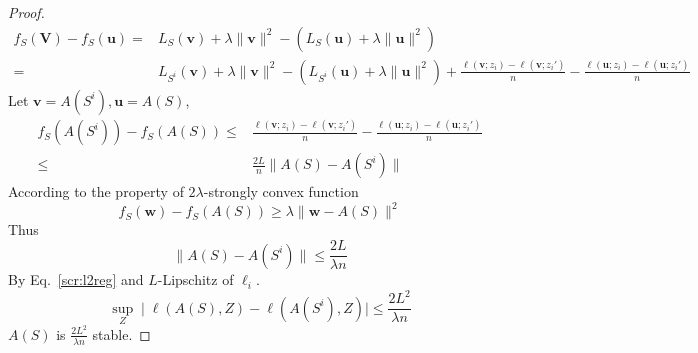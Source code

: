 \documentclass[12pt]{report}
\def \bs{\boldsymbol}
\newcommand{\abs}[1]{\mid #1 \mid}
\begin{document}
\begin{proof}
	\begin{align*}
		f_S(\bs{V}) - f_S(\bs{u}) =& L_S(\bs{v}) + \lambda \| \bs{v} \|^2 - (L_S(\bs{u}) + \lambda \| \bs{u} \|^2) \\
		=& L_{S^i}(\bs{v}) + \lambda \| \bs{v} \|^2 - (L_{S^i}(\bs{u}) + \lambda \| \bs{u} \|^2) + \frac{\ell(\bs{v};z_i) - \ell(\bs{v};z_i')}{n} - \frac{\ell(\bs{u};z_i) - \ell(\bs{u};z_i')}{n} 
	\end{align*}
	Let $\bs{v} = A(S^i), \bs{u} = A(S)$, 
	\begin{align*}
		f_S(A(S^i)) - f_S(A(S)) \le& \frac{\ell(\bs{v};z_i) - \ell(\bs{v};z_i')}{n} - \frac{\ell(\bs{u};z_i) - \ell(\bs{u};z_i')}{n} \\
		\le& \frac{2L}{n} \| A(S) - A(S^i) \|
	\end{align*}
	According to the property of $2\lambda$-strongly convex function 
	\begin{equation*}
		f_S(\bs{w}) - f_S(A(S)) \ge \lambda \| \bs{w} - A(S) \|^2
	\end{equation*} 
	Thus
	\begin{equation} \label{scr:l2reg}
		\| A(S) - A(S^i) \| \le \frac{2L}{\lambda n}
	\end{equation}	
	By Eq.~\ref{scr:l2reg} and $L$-Lipschitz of $\ell_i$.
	\begin{equation*}
		\sup_Z \abs{\ell(A(S), Z) - \ell(A(S^i), Z)} \le \frac{2L^2}{\lambda n}
	\end{equation*}
	$A(S)$ is $\frac{2L^2}{\lambda n}$ stable.
\end{proof}
\end{document}
